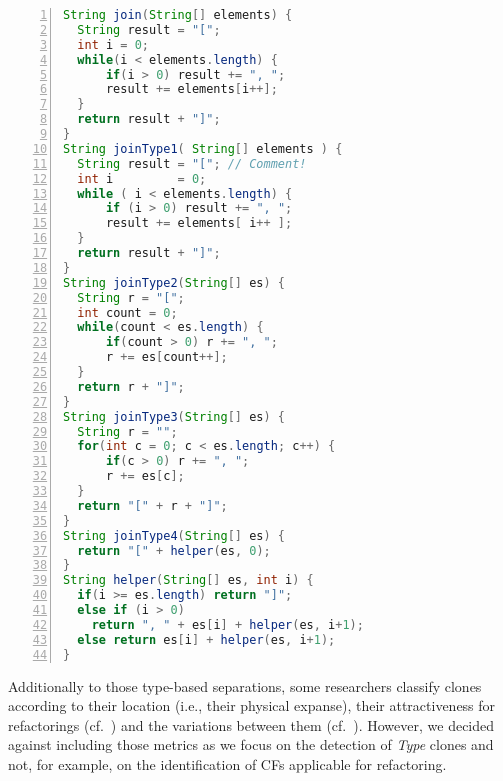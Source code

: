 \documentclass[10pt,journal,compsoc]{IEEEtran}
\def\T#1{\textsl{Type\nobreakdash-#1}}
\def\todo#1{\textcolor{brown!80!yellow!70!black!90!red}{[\textsc{todo}: \textsf{#1}]}}
\begin{document}
\begin{lstlisting}[float,caption={Example of the four different clone types \protect\T{1\,--\,4} in Java (based on {\cite[Listing 1]{saini2018oreo}} and {\cite[List 3]{wu2020scdetector}}).\bigskip},abovecaptionskip=0pt,language=Java,basicstyle=\ttfamily,numbers=left,frame=single,keywordstyle={[2]{\itshape}},morekeywords={[2]{String}},numberstyle=\sffamily\scriptsize,label=clone-types-examples]
String join(String[] elements) {
  String result = "[";
  int i = 0;
  while(i < elements.length) {
      if(i > 0) result += ", ";
      result += elements[i++];
  }
  return result + "]";
}
String joinType1( String[] elements ) {
  String result = "["; // Comment!
  int i         = 0;
  while ( i < elements.length) {
      if (i > 0) result += ", ";
      result += elements[ i++ ];
  }
  return result + "]";
}
String joinType2(String[] es) {
  String r = "[";
  int count = 0;
  while(count < es.length) {
      if(count > 0) r += ", ";
      r += es[count++];
  }
  return r + "]";
}
String joinType3(String[] es) {
  String r = "";
  for(int c = 0; c < es.length; c++) {
      if(c > 0) r += ", ";
      r += es[c];
  }
  return "[" + r + "]";
}
String joinType4(String[] es) {
  return "[" + helper(es, 0);
}
String helper(String[] es, int i) {
  if(i >= es.length) return "]";
  else if (i > 0)
    return ", " + es[i] + helper(es, i+1);
  else return es[i] + helper(es, i+1);
}
\end{lstlisting}

Additionally to those type-based separations, some researchers classify clones according to their location (i.e., their physical expanse), their attractiveness for refactorings (cf.~\cite{gautam2016various}) and the variations between them (cf.~\cite{gorg2017deriving}).
However, we decided against including those metrics as we focus on the detection of \T4 clones and not, for example, on the identification of CFs applicable for refactoring.


\end{document}

